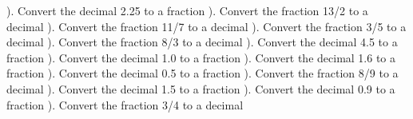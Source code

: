 \documentclass{article}%
\begin{document}
\newline%
\newline%
). Convert the decimal 2.25 to a fraction%
\newline%
\newline%
). Convert the fraction 13/2 to a decimal%
\newline%
\newline%
). Convert the fraction 11/7 to a decimal%
\newline%
\newline%
). Convert the fraction 3/5 to a decimal%
\newline%
\newline%
). Convert the fraction 8/3 to a decimal%
\newline%
\newline%
). Convert the decimal 4.5 to a fraction%
\newline%
\newline%
). Convert the decimal 1.0 to a fraction%
\newline%
\newline%
). Convert the decimal 1.6 to a fraction%
\newline%
\newline%
). Convert the decimal 0.5 to a fraction%
\newline%
\newline%
). Convert the fraction 8/9 to a decimal%
\newline%
\newline%
). Convert the decimal 1.5 to a fraction%
\newline%
\newline%
). Convert the decimal 0.9 to a fraction%
\newline%
\newline%
). Convert the fraction 3/4 to a decimal%
\newline%
\newline%
\end{document}
